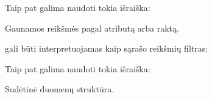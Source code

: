 \documentclass[letterpaper,10pt,lithuanian]{sphinxmanual}
\begin{document}
\begin{fulllineitems}
\label{\detokenize{formules:func.getitem}}
\pysigstartsignatures
{}
\pysigstopsignatures
\sphinxAtStartPar
Taip pat galima naudoti tokia išraiška:

\begin{sphinxVerbatim}[commandchars=\\\{\}]
\PYG{p}{[}\PYG{p}{]}
\end{sphinxVerbatim}

\sphinxAtStartPar
Gaunamos reikšmės pagal atributą arba raktą.

\sphinxAtStartPar
{\hyperref[\detokenize{formules:id14}]{}} gali būti interpretuojamas kaip sąrašo reikšmių filtras:

\begin{sphinxVerbatim}[commandchars=\\\{\}]
\PYG{p}{[}  \PYG{p}{]}
\end{sphinxVerbatim}

\end{fulllineitems}


\begin{fulllineitems}
\label{\detokenize{formules:func.dict}}
\pysigstartsignatures
{}
\pysigstopsignatures
\sphinxAtStartPar
Taip pat galima naudoti tokia išraiška:

\begin{sphinxVerbatim}[commandchars=\\\{\}]
 
\end{sphinxVerbatim}

\sphinxAtStartPar
Sudėtinė duomenų struktūra.

\end{fulllineitems}

\end{document}
